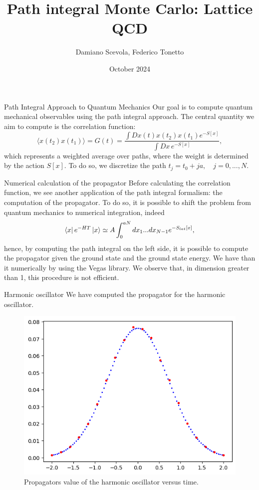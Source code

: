 \documentclass{beamer}
\title{Path integral Monte Carlo: Lattice QCD}
\author{Damiano Scevola, Federico Tonetto}
\institute{University of Bologna}
\date{October 2024}
\begin{document}
\frame{\titlepage}

\begin{frame}{Path Integral Approach to Quantum Mechanics}
    Our goal is to compute quantum mechanical observables using the path integral approach. The central quantity we aim to compute is the correlation function:
    \begin{equation*}
        \langle x(t_2)x(t_1)\rangle = G(t) = \frac{\int Dx(t) x(t_2) x(t_1) e^{-S[x]}}{\int Dx \, e^{-S[x]}},
    \end{equation*}
    which represents a weighted average over paths, where the weight is determined by the action $S[x]$.
    To do so, we discretize the path $t_j = t_0 + ja, \quad j=0,...,N$.
\end{frame}

\begin{frame}{Numerical calculation of the propagator}
    Before calculating the correlation function, we see another application of the path integral formalism: the computation of the propagator.
    To do so, it is possible to shift the problem from quantum mechanics to numerical integration, indeed
    \begin{equation*}
        \bra{x}e^{-HT}\ket{x} \simeq A\int_0^{aN} dx_1...dx_{N-1} e^{-S_{lat} [x]},
    \end{equation*}
    hence, by computing the path integral on the left side, it is possible to compute the propagator given the ground state and the ground state energy. We have than it numerically by using the Vegas library.  We observe that, in dimension greater than 1, this procedure is not efficient.
\end{frame}

\begin{frame}{Harmonic oscillator}
    We have computed the propagator for the harmonic oscillator.
    \begin{figure}
        \centering
        \includegraphics[width=0.5\linewidth]{harmonic_oscillator_numerical_propagator.png}
        \caption{Propagators value of the harmonic oscillator versus time.}
        \label{fig:harmonic}
    \end{figure}
\end{frame}
\end{document}
